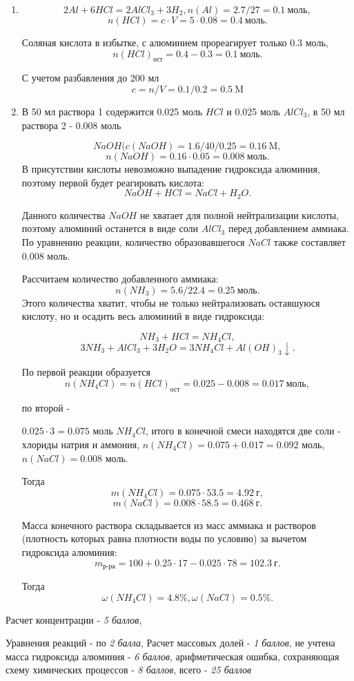 \solutionSection

\begin{enumerate}
    \item $$2Al + 6HCl = 2AlCl_3 + 3H_2, n(Al) = 2.7/27 = 0.1 \: \text{моль},$$ 
    $$n(HCl) = c \cdot V = 5 \cdot 0.08 = 0.4 \: \text{моль}.$$
    
    Соляная кислота в избытке, с алюминием прореагирует только 0.3 моль, 
    $$n(HCl)_\text{ост} = 0.4 - 0.3 = 0.1\: \text{моль}.$$

    С учетом разбавления до 200 мл $$c = n/V = 0.1/0.2 = 0.5 \: \text{M}$$
    \item В 50 мл раствора 1 содержится 0.025 моль $HCl$ и 0.025 моль $AlCl_3$, в 50 мл раствора 2 - 0.008 моль
    
    $$NaOH (c(NaOH) = 1.6/40/0.25= 0.16\: \text{M},$$
    $$n(NaOH) = 0.16 \cdot 0.05 = 0.008\: \text{моль}.$$ 
    В присутствии кислоты невозможно 
    выпадение гидроксида алюминия, поэтому первой будет реагировать кислота: $$NaOH + HCl = NaCl + H_2O.$$ 
    
    Данного 
    количества $NaOH$ не хватает для полной нейтрализации кислоты, поэтому алюминий останется в виде соли $AlCl_3$ 
    перед добавлением аммиака. По уравнению реакции, количество образовавшегося $NaCl$ также составляет 0.008 моль.
    
    Рассчитаем количество добавленного аммиака: $$n(NH_3) = 5.6/22.4 = 0.25\: \text{моль}.$$ Этого количества хватит, чтобы не 
    только нейтрализовать оставшуюся кислоту, но и осадить весь алюминий в виде гидроксида:

    $$NH_3 + HCl = NH_4Cl,$$ 
    $$3NH_3 + AlCl_3 + 3H_2O = 3NH_4Cl + Al(OH)_3 \downarrow.$$
    
    По первой реакции образуется $$n(NH_4Cl) = n(HCl)_\text{ост} = 0.025 - 0.008 = 0.017\: \text{моль},$$
    
    по второй - 
    
    $0.025 \cdot 3 = 0.075$ моль $NH_4Cl$, итого в конечной смеси находятся две соли - хлориды натрия и аммония, 
    $n(NH_4Cl) = 0.075 + 0.017 = 0.092$ моль, $n(NaCl) = 0.008$ моль. 
    
    Тогда $$m(NH_4Cl) = 0.075 \cdot 53.5 = 4.92 \: \text{г},$$
    $$m(NaCl) = 0.008 \cdot 58.5 = 0.468 \: \text{г}.$$

    Масса конечного раствора складывается из масс аммиака и растворов (плотность которых равна плотности воды по 
    условию) за вычетом гидроксида алюминия: $$m_{\text{р-ра}} = 100 + 0.25 \cdot 17 - 0.025 \cdot 78= 102.3 \: \text{г}.$$
    
    Тогда $$\omega(NH_4Cl) = 4.8\%, \omega(NaCl) = 0.5\%.$$
    
\end{enumerate}

\additionalCriteria

Расчет концентрации - \textit{5 баллов}, 

Уравнения реакций - по \textit{2 балла}, Расчет массовых долей - \textit{1 баллов}, не учтена масса гидроксида алюминия - \textit{6 баллов}, арифметическая ошибка, сохраняющая схему химических процессов - \textit{8 баллов}, всего - \textit{25 баллов}
